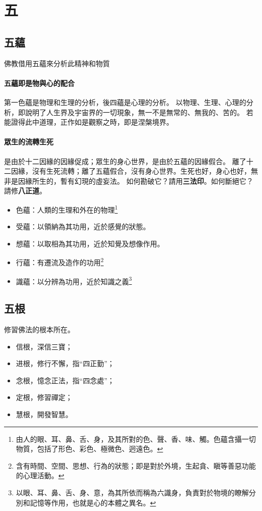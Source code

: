 \section{五}

\subsection{五蘊}
佛教借用五蘊來分析此精神和物質
\paragraph{五蘊即是物與心的配合}
第一色蘊是物理和生理的分析，後四蘊是心理的分析。
以物理、生理、心理的分析，即說明了人生界及宇宙界的一切現象，無一不是無常的、無我的、苦的。
若能證得此中道理，正作如是觀察之時，即是涅槃境界。
\paragraph{眾生的流轉生死} 是由於十二因緣的因緣促成；眾生的身心世界，是由於五蘊的因緣假合。
離了十二因緣，沒有生死流轉；離了五蘊假合，沒有身心世界。生死也好，身心也好，無非是因緣所生的，暫有幻現的虛妄法。
如何勘破它？請用\textbf{三法印}。如何斷絕它？請修\textbf{八正道}。

\begin{itemize}
  \item 色蘊：人類的生理和外在的物理\footnote{由人的眼、耳、鼻、舌、身，及其所對的色、聲、香、味、觸。色蘊含攝一切物質，包括了形色、彩色、極微色、迥遠色。}
  \item 受蘊：以領納為其功用，近於感覺的狀態。
  \item 想蘊：以取相為其功用，近於知覺及想像作用。
  \item 行蘊：有遷流及造作的功用\footnote{含有時間、空間、思想、行為的狀態；即是對於外境，生起貪、瞋等善惡功能的心理活動。}
  \item 識蘊：以分辨為功用，近於知識之義\footnote{以眼、耳、鼻、舌、身、意，為其所依而稱為六識身，負責對於物境的瞭解分別和記憶等作用，也就是心的本體之異名。}
\end{itemize}


\subsection{五根}
修習佛法的根本所在。
\begin{itemize}
  \item 信根，深信三寶；
  \item 进根，修行不懈，指“四正勤”；
  \item 念根，憶念正法，指“四念處”；
  \item 定根，修習禪定；
  \item 慧根，開發智慧。
\end{itemize}

